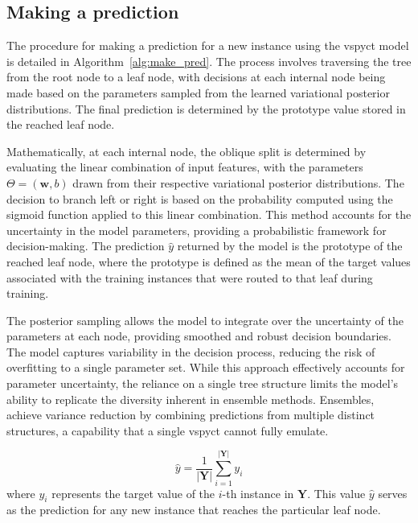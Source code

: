 \documentclass[3p,review,authoryear]{elsarticle}
\begin{document}
\subsection{Making a prediction}

The procedure for making a prediction for a new instance using the \gls{vspyct} model is detailed in Algorithm~\ref{alg:make_pred}.
The process involves traversing the tree from the root node to a leaf node, with decisions at each internal node being made based on the parameters sampled from the learned variational posterior distributions.
The final prediction is determined by the prototype value stored in the reached leaf node.

Mathematically, at each internal node, the oblique split is determined by evaluating the linear combination of input features, with the parameters \(\Theta = (\mathbf{w}, b)\) drawn from their respective variational posterior distributions. The decision to branch left or right is based on the probability computed using the sigmoid function applied to this linear combination. This method accounts for the uncertainty in the model parameters, providing a probabilistic framework for decision-making.
The prediction \(\hat{y}\) returned by the model is the prototype of the reached leaf node, where the prototype is defined as the mean of the target values associated with the training instances that were routed to that leaf during training.

The posterior sampling allows the model to integrate over the uncertainty of the parameters at each node, providing smoothed and robust decision boundaries.
The model captures variability in the decision process, reducing the risk of overfitting to a single parameter set.
While this approach effectively accounts for parameter uncertainty, the reliance on a single tree structure limits the model’s ability to replicate the diversity inherent in ensemble methods.
Ensembles, achieve variance reduction by combining predictions from multiple distinct structures, a capability that a single \gls{vspyct} cannot fully emulate.

\begin{equation}
\hat{y} = \frac{1}{|\mathbf{Y}|} \sum_{i=1}^{|\mathbf{Y}|} y_i
\end{equation}
where \( y_i \) represents the target value of the \(i\)-th instance in \(\mathbf{Y}\).
This value $\hat{y}$ serves as the prediction for any new instance that reaches the particular leaf node.
\end{document}
